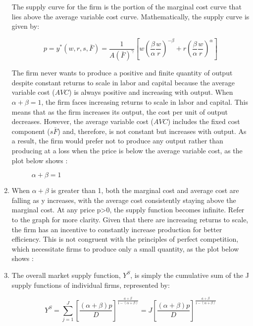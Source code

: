 \documentclass[UTF8,titlepage]{article}
\numberwithin{figure}{section}
\begin{document}
\begin{enumerate}
The supply curve for the firm is the portion of the marginal cost curve that lies above the average variable cost curve. Mathematically, the supply curve is given by:

$$
p = y^{*}(w, r, s, \bar{F}) = \frac{1}{A(\bar{F})^{\gamma}}\left[w\left(\frac{\beta}{\alpha} \frac{w}{r}\right)^{-\beta}+r\left(\frac{\beta}{\alpha} \frac{w}{r}\right)^{\alpha}\right]
$$

The firm never wants to produce a positive and finite quantity of output despite constant returns to scale in labor and capital because the average variable cost (\(AVC\)) is always positive and increasing with output. When \(\alpha + \beta = 1\), the firm faces increasing returns to scale in labor and capital. This means that as the firm increases its output, the cost per unit of output decreases. However, the average variable cost (\(AVC\)) includes the fixed cost component (\(s\bar{F}\)) and, therefore, is not constant but increases with output. As a result, the firm would prefer not to produce any output rather than producing at a loss when the price is below the average variable cost, as the plot below shows :
\begin{figure}[H]
\centering
 \caption{$\alpha + \beta =1$}
 \label{}
\end{figure}

\item When $\alpha+\beta$ is greater than 1, both the marginal cost and average cost are falling as y increases, with the average cost consistently staying above the marginal cost. At any price p>0, the supply function becomes infinite. Refer to the graph for more clarity. Given that there are increasing returns to scale, the firm has an incentive to constantly increase production for better efficiency. This is not congruent with the principles of perfect competition, which necessitate firms to produce only a small quantity, as the plot below shows :
\begin{figure}[H]
\centering
 \caption{}
 \label{}
\end{figure}

\item The overall market supply function, $Y^{S}$, is simply the cumulative sum of the J supply functions of individual firms, represented by:

\[Y^{S}=\sum_{j=1}^{J}\left[\frac{(\alpha+\beta) p}{D}\right]^{\frac{a+\beta}{1-(\alpha+\beta)}}=J\left[\frac{(\alpha+\beta) p}{D}\right]^{\frac{a+\beta}{1-(\alpha+\beta)}}\]


\end{enumerate}
\end{document}
